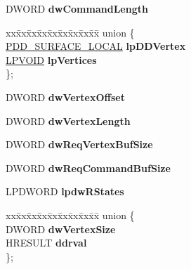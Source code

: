 \begin{DoxyCompactItemize}
D\+W\+O\+RD {\bfseries dw\+Command\+Length}
\item 
\mbox{\label{struct___d3_d_n_t_h_a_l___d_r_a_w_p_r_i_m_i_t_i_v_e_s2_d_a_t_a_af3d0a962a6c4c8fa38a0e7d746c5785c}} 
\begin{tabbing}
xx\=xx\=xx\=xx\=xx\=xx\=xx\=xx\=xx\=\kill
union \{\\
\>\hyperlink{struct___d_d___s_u_r_f_a_c_e___l_o_c_a_l}{PDD\_SURFACE\_LOCAL} {\bfseries lpDDVertex}\\
\>\hyperlink{interfacevoid}{LPVOID} {\bfseries lpVertices}\\
\}; \\

\end{tabbing}\item 
\mbox{\label{struct___d3_d_n_t_h_a_l___d_r_a_w_p_r_i_m_i_t_i_v_e_s2_d_a_t_a_a138f48ac0ef0561a7a4c3f41c4bff51f}} 
D\+W\+O\+RD {\bfseries dw\+Vertex\+Offset}
\item 
\mbox{\label{struct___d3_d_n_t_h_a_l___d_r_a_w_p_r_i_m_i_t_i_v_e_s2_d_a_t_a_ae7ac302babd3cab119e598bf0a3dfc1b}} 
D\+W\+O\+RD {\bfseries dw\+Vertex\+Length}
\item 
\mbox{\label{struct___d3_d_n_t_h_a_l___d_r_a_w_p_r_i_m_i_t_i_v_e_s2_d_a_t_a_af0d1f43d59b4752f034f36c5ae8192c4}} 
D\+W\+O\+RD {\bfseries dw\+Req\+Vertex\+Buf\+Size}
\item 
\mbox{\label{struct___d3_d_n_t_h_a_l___d_r_a_w_p_r_i_m_i_t_i_v_e_s2_d_a_t_a_af116e55980e11504bfa8f00dc5f4375f}} 
D\+W\+O\+RD {\bfseries dw\+Req\+Command\+Buf\+Size}
\item 
\mbox{\label{struct___d3_d_n_t_h_a_l___d_r_a_w_p_r_i_m_i_t_i_v_e_s2_d_a_t_a_aea83a3f032e8aa7114917f78ab409e7b}} 
L\+P\+D\+W\+O\+RD {\bfseries lpdw\+R\+States}
\item 
\mbox{\label{struct___d3_d_n_t_h_a_l___d_r_a_w_p_r_i_m_i_t_i_v_e_s2_d_a_t_a_adb3aab0e5e26e077fc5aa8ddee5b338d}} 
\begin{tabbing}
xx\=xx\=xx\=xx\=xx\=xx\=xx\=xx\=xx\=\kill
union \{\\
\>DWORD {\bfseries dwVertexSize}\\
\>HRESULT {\bfseries ddrval}\\
\}; \\


\end{tabbing}
\end{DoxyCompactItemize}
